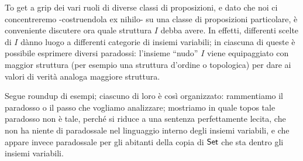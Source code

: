 To get a grip dei vari ruoli di diverse classi di proposizioni, e dato che noi ci concentreremo -costruendola ex nihilo- su una classe di proposizioni particolare, è conveniente discutere ora quale struttura $I$ debba avere. In effetti, differenti scelte di $I$ dànno luogo a differenti categorie di insiemi variabili; in ciascuna di queste è possibile esprimere diversi paradossi: l'insieme ``nudo'' $I$  viene equipaggiato con maggior struttura (per esempio una struttura d'ordine o topologica) per dare ai valori di verità analoga maggiore struttura.

Segue roundup di esempi; ciascuno di loro è così organizzato: rammentiamo il paradosso o il passo che vogliamo analizzare; mostriamo in quale topos tale paradosso non è tale, perché si riduce a una sentenza perfettamente lecita, che non ha niente di paradossale nel linguaggio interno degli insiemi variabili, e che appare invece paradossale per gli abitanti della copia di $\mathsf{Set}$ che sta dentro gli insiemi variabili.

